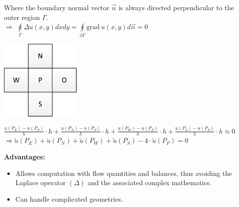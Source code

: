 Where the boundary normal vector $\vec{n}$ is always directed perpendicular to the outer region $\Gamma$.\\

$\Rightarrow$ $\oint\limits_{\Gamma}{\Delta u(x,y) dx dy}=\oint\limits_{\partial\Gamma}{\mathrm{grad}~ u(x,y) d\vec{n}}=0$

\begin{minipage}{4cm}
	\includegraphics[width=4cm]{Content/02_numerics/FVMPrinzip.png}
\end{minipage}
\hfill
\begin{minipage}{14cm}
	$\frac{u(P_E)-u(P_P)}{h}\cdot h+\frac{u(P_N)-u(P_P)}{h}\cdot h+\frac{u(P_W)-u(P_P)}{h}\cdot h+\frac{u(P_S)-u(P_P)}{h}\cdot h\approx 0$\\

	$\Rightarrow\tilde{u}(P_E)+\tilde{u}(P_N)+\tilde{u}(P_W)+\tilde{u}(P_S)-4\cdot\tilde{u}(P_P)=0$
\end{minipage}

\textbf{Advantages:}
\begin{itemize}
\item Allows computation with flow quantities and balances, thus avoiding the Laplace operator $(\Delta)$ and the associated complex mathematics.
\item Can handle complicated geometries.
\end{itemize}

